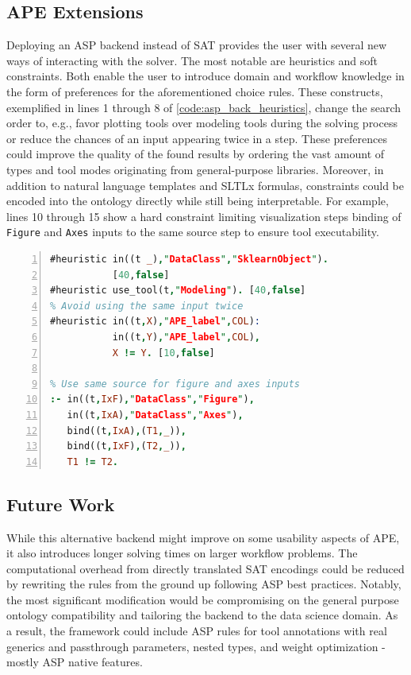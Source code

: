 \subsection{APE Extensions}
Deploying an ASP backend instead of SAT provides the user with several new ways of interacting with the solver. The most notable are heuristics and soft constraints. Both enable the user to introduce domain and workflow knowledge in the form of preferences for the aforementioned choice rules. These constructs, exemplified in lines 1 through 8 of \autoref{code:asp_back_heuristics}, change the search order to, e.g., favor plotting tools over modeling tools during the solving process or reduce the chances of an input appearing twice in a step. These preferences could improve the quality of the found results by ordering the vast amount of types and tool modes originating from general-purpose libraries. Moreover, in addition to natural language templates and SLTLx formulas, constraints could be encoded into the ontology directly while still being interpretable. For example, lines 10 through 15 show a hard constraint limiting visualization steps binding of \verb|Figure| and \verb|Axes| inputs to the same source step to ensure tool executability.

\begin{lstlisting}[language=Prolog, caption=ASP Heuristics Encoding Domain and User Preferences., label=code:asp_back_heuristics, numbers=left,numberstyle=\tiny]
% Usually no modeling
#heuristic in((t _),"DataClass","SklearnObject").
           [40,false]
#heuristic use_tool(t,"Modeling"). [40,false]
% Avoid using the same input twice
#heuristic in((t,X),"APE_label",COL):
           in((t,Y),"APE_label",COL),
           X != Y. [10,false]

% Use same source for figure and axes inputs
:- in((t,IxF),"DataClass","Figure"),
   in((t,IxA),"DataClass","Axes"),
   bind((t,IxA),(T1,_)),
   bind((t,IxF),(T2,_)),
   T1 != T2.
\end{lstlisting}

\subsection{Future Work}
While this alternative backend might improve on some usability aspects of APE, it also introduces longer solving times on larger workflow problems. The computational overhead from directly translated SAT encodings could be reduced by rewriting the rules from the ground up following ASP best practices. Notably, the most significant modification would be compromising on the general purpose ontology compatibility and tailoring the backend to the data science domain. As a result, the framework could include ASP rules for tool annotations with real generics and passthrough parameters, nested types, and weight optimization - mostly ASP native features.
